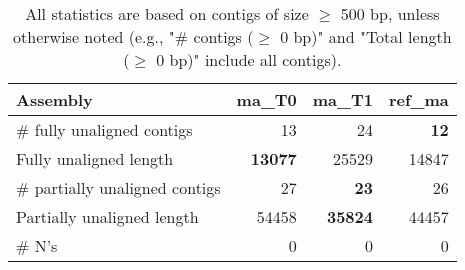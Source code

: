 \documentclass[12pt,a4paper]{article}
\begin{document}
\begin{table}[ht]
\begin{center}
\caption{All statistics are based on contigs of size $\geq$ 500 bp, unless otherwise noted (e.g., "\# contigs ($\geq$ 0 bp)" and "Total length ($\geq$ 0 bp)" include all contigs).}
\begin{tabular}{|l*{3}{|r}|}
\hline
Assembly & ma\_T0 & ma\_T1 & ref\_ma \\ \hline
\# fully unaligned contigs & 13 & 24 & {\bf 12} \\ \hline
Fully unaligned length & {\bf 13077} & 25529 & 14847 \\ \hline
\# partially unaligned contigs & 27 & {\bf 23} & 26 \\ \hline
Partially unaligned length & 54458 & {\bf 35824} & 44457 \\ \hline
\# N's & 0 & 0 & 0 \\ \hline
\end{tabular}
\end{center}
\end{table}
\end{document}
